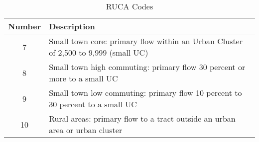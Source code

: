 \begin{table}[htbp]
    \centering
    \caption{RUCA Codes}
    \label{tab:town_description}
    \begin{tabular}{|c|p{10cm}|}
        \hline
        \textbf{Number} & \textbf{Description} \\
        \hline
        7 & Small town core: primary flow within an Urban Cluster of 2,500 to 9,999 (small UC) \\
        \hline
        8 & Small town high commuting: primary flow 30 percent or more to a small UC \\
        \hline
        9 & Small town low commuting: primary flow 10 percent to 30 percent to a small UC \\
        \hline
        10 & Rural areas: primary flow to a tract outside an urban area or urban cluster \\
        \hline
    \end{tabular}
\end{table}